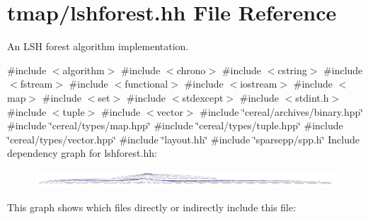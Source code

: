 \hypertarget{lshforest_8hh}{}\section{tmap/lshforest.hh File Reference}
\label{lshforest_8hh}


An L\+SH forest algorithm implementation.  


{\ttfamily \#include $<$algorithm$>$}\newline
{\ttfamily \#include $<$chrono$>$}\newline
{\ttfamily \#include $<$cstring$>$}\newline
{\ttfamily \#include $<$fstream$>$}\newline
{\ttfamily \#include $<$functional$>$}\newline
{\ttfamily \#include $<$iostream$>$}\newline
{\ttfamily \#include $<$map$>$}\newline
{\ttfamily \#include $<$set$>$}\newline
{\ttfamily \#include $<$stdexcept$>$}\newline
{\ttfamily \#include $<$stdint.\+h$>$}\newline
{\ttfamily \#include $<$tuple$>$}\newline
{\ttfamily \#include $<$vector$>$}\newline
{\ttfamily \#include \char`\"{}cereal/archives/binary.\+hpp\char`\"{}}\newline
{\ttfamily \#include \char`\"{}cereal/types/map.\+hpp\char`\"{}}\newline
{\ttfamily \#include \char`\"{}cereal/types/tuple.\+hpp\char`\"{}}\newline
{\ttfamily \#include \char`\"{}cereal/types/vector.\+hpp\char`\"{}}\newline
{\ttfamily \#include \char`\"{}layout.\+hh\char`\"{}}\newline
{\ttfamily \#include \char`\"{}sparsepp/spp.\+h\char`\"{}}\newline
Include dependency graph for lshforest.\+hh\+:\nopagebreak
\begin{figure}[H]
\begin{center}
\leavevmode
\includegraphics[width=350pt]{lshforest_8hh__incl}
\end{center}
\end{figure}
This graph shows which files directly or indirectly include this file\+:\nopagebreak
